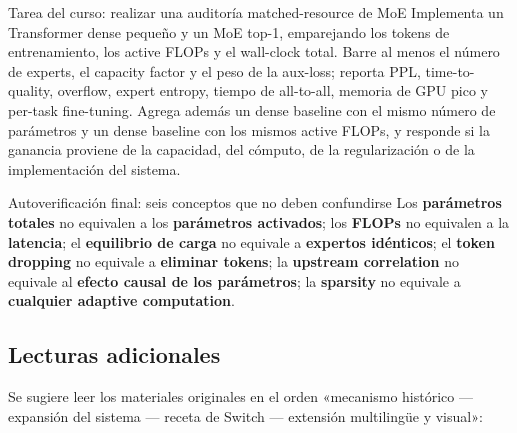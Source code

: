 \begin{importantbox}{Tarea del curso: realizar una auditoría matched-resource de MoE}
Implementa un Transformer dense pequeño y un MoE top-1, emparejando los tokens de entrenamiento, los active FLOPs y el wall-clock total. Barre al menos el número de experts, el capacity factor y el peso de la aux-loss; reporta PPL, time-to-quality, overflow, expert entropy, tiempo de all-to-all, memoria de GPU pico y per-task fine-tuning. Agrega además un dense baseline con el mismo número de parámetros y un dense baseline con los mismos active FLOPs, y responde si la ganancia proviene de la capacidad, del cómputo, de la regularización o de la implementación del sistema.
\end{importantbox}

\begin{warningbox}{Autoverificación final: seis conceptos que no deben confundirse}
Los \textbf{parámetros totales} no equivalen a los \textbf{parámetros activados}; los \textbf{FLOPs} no equivalen a la \textbf{latencia}; el \textbf{equilibrio de carga} no equivale a \textbf{expertos idénticos}; el \textbf{token dropping} no equivale a \textbf{eliminar tokens}; la \textbf{upstream correlation} no equivale al \textbf{efecto causal de los parámetros}; la \textbf{sparsity} no equivale a \textbf{cualquier adaptive computation}.
\end{warningbox}

\subsection{Lecturas adicionales}

Se sugiere leer los materiales originales en el orden «mecanismo histórico — expansión del sistema — receta de Switch — extensión multilingüe y visual»:

